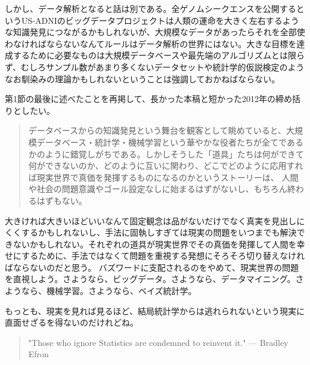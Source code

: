 しかし、データ解析となると話は別である。全ゲノムシークエンスを公開するというUS-ADNIのビッグデータプロジェクトは人類の運命を大きく左右するような知識発見につながるかもしれないが、大規模なデータがあったらそれを全部使わなければならないなんてルールはデータ解析の世界にはない。大きな目標を達成するために必要なものは大規模データベースや最先端のアルゴリズムとは限らず、むしろサンプル数があまり多くないデータセットや統計学的仮説検定のようなお馴染みの理論かもしれないということは強調しておかねばならない。

第1節の最後に述べたことを再掲して、長かった本稿と短かった2012年の締め括りとしたい。
\begin{quote}
データベースからの知識発見という舞台を観客として眺めていると、大規模データベース・統計学・機械学習という華やかな役者たちが全てであるかのように錯覚しがちである。しかしそうした「道具」たちは何ができて何ができないのか、どのように互いに関わり、どこでどのように応用すれば現実世界で真価を発揮するものになるのかというストーリーは、
人間や社会の問題意識やゴール設定なしに始まるはずがないし、もちろん終わるはずもない。
\end{quote}

大きければ大きいほどいいなんて固定観念は品がないだけでなく真実を見出しにくくするかもしれないし、手法に固執しすぎては現実の問題をいつまでも解決できないかもしれない。それぞれの道具が現実世界でその真価を発揮して人間を幸せにするために、手法ではなくて問題を重視する発想にそろそろ切り替えなければならないのだと思う。
バズワードに支配されるのをやめて、現実世界の問題を直視しよう。さようなら、ビッグデータ。さようなら、データマイニング。さようなら、機械学習。さようなら、ベイズ統計学。

もっとも、現実を見れば見るほど、結局統計学からは逃れられないという現実に直面せざるを得ないのだけれどね。
\begin{quote}
"Those who ignore Statistics are condemned to reinvent it." --- Bradley Efron
\end{quote}